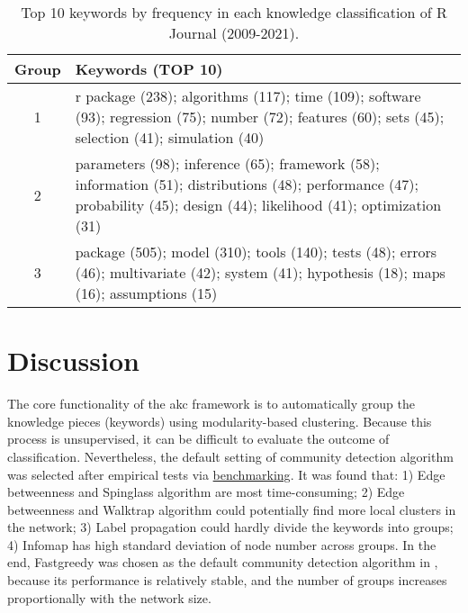 \begin{Schunk}
\begin{table}

\centering
\fontsize{7}{9}\selectfont
\begin{tabular}[t]{c|>{\centering\arraybackslash}p{10cm}}
\hline
Group & Keywords (TOP 10)\\
\hline
1 & r package (238); algorithms (117); time (109); software (93); regression (75); number (72); features (60); sets (45); selection (41); simulation (40)\\
\hline
2 & parameters (98); inference (65); framework (58); information (51); distributions (48); performance (47); probability (45); design (44); likelihood (41); optimization (31)\\
\hline
3 & package (505); model (310); tools (140); tests (48); errors (46); multivariate (42); system (41); hypothesis (18); maps (16); assumptions (15)\\
\hline
\end{tabular}

\caption{\label{tab:tab2-2}Top 10 keywords by frequency in each knowledge classification of R Journal (2009-2021).}
\end{table}

\end{Schunk}

\hypertarget{discussion}{%
\section{Discussion}\label{discussion}}

The core functionality of the akc framework is to automatically group
the knowledge pieces (keywords) using modularity-based clustering.
Because this process is unsupervised, it can be difficult to evaluate
the outcome of classification. Nevertheless, the default setting of
community detection algorithm was selected after empirical tests via
\href{https://cran.r-project.org/web/packages/akc/vignettes/Benchmarking.html}{benchmarking}.
It was found that: 1) Edge betweenness and Spinglass algorithm are most
time-consuming; 2) Edge betweenness and Walktrap algorithm could
potentially find more local clusters in the network; 3) Label
propagation could hardly divide the keywords into groups; 4) Infomap has
high standard deviation of node number across groups. In the end,
Fastgreedy was chosen as the default community detection algorithm in
, because its performance is relatively stable, and the
number of groups increases proportionally with the network size.

